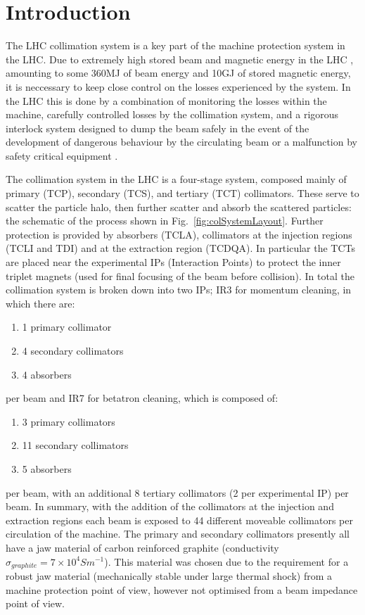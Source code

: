 \section{Introduction}

The LHC collimation system is a key part of the machine protection system in the LHC. Due to extremely high stored beam and magnetic energy in the LHC \cite{Schmidt:LHCMP}, amounting to some 360MJ of beam energy and 10GJ of stored magnetic energy, it is neccessary to keep close control on the losses experienced by the system. In the LHC this is done by a combination of monitoring the losses within the machine, carefully controlled losses by the collimation system, and a rigorous interlock system designed to dump the beam safely in the event of the development of dangerous behaviour by the circulating beam or a malfunction by safety critical equipment \cite{Schmidt:LHCMP}.

The collimation system in the LHC is a four-stage system, composed mainly of primary (TCP), secondary (TCS), and tertiary (TCT) collimators. These serve to scatter the particle halo, then further scatter and absorb the scattered particles: the schematic of the process shown in Fig.~\ref{fig:colSystemLayout}. Further protection is provided by absorbers (TCLA), collimators at the injection regions (TCLI and TDI) and at the extraction region (TCDQA). In particular the TCTs are placed near the experimental IPs (Interaction Points) to protect the inner triplet magnets (used for final focusing of the beam before collision). In total the collimation system is broken down into two IPs; IR3 for momentum cleaning, in which there are:

\begin{enumerate}
\item{1 primary collimator}
\item{4 secondary collimators}
\item{4 absorbers}
\end{enumerate}

per beam and IR7 for betatron cleaning, which is composed of:

\begin{enumerate}
\item{3 primary collimators}
\item{11 secondary collimators}
\item{5 absorbers}
\end{enumerate}

per beam, with an additional 8 tertiary collimators (2 per experimental IP) per beam. In summary, with the addition of the collimators at the injection and extraction regions each beam is exposed to 44 different moveable collimators per circulation of the machine. The primary and secondary collimators presently all have a jaw material of carbon reinforced graphite (conductivity $\sigma_{graphite} = 7 \times 10^{4} S m^{-1} $). This material was chosen due to the requirement for a robust jaw material (mechanically stable under large thermal shock) from a machine protection point of view, however not optimised from a beam impedance point of view.

